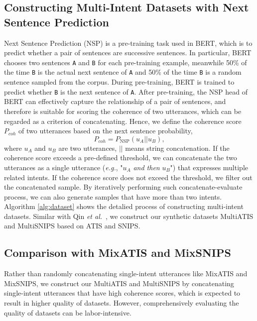 \documentclass[11pt]{article}
\begin{document}
\subsection{Constructing Multi-Intent Datasets with Next Sentence Prediction}
Next Sentence Prediction (NSP) is a pre-training task used in BERT\cite{DBLP:conf/naacl/DevlinCLT19}, which is to predict whether a pair of sentences are successive sentences. In particular, BERT chooses two sentences \texttt{A} and \texttt{B} for each pre-training example, meanwhile 50\% of the time \texttt{B} is the actual next sentence of \texttt{A} and 50\% of the time \texttt{B} is a random sentence sampled from the corpus. During pre-training, BERT is trained to predict whether \texttt{B} is the next sentence of \texttt{A}. After pre-training, the NSP head of BERT can effectively capture the relationship of a pair of sentences, and therefore is suitable for scoring the coherence of two utterances, which can be regarded as a criterion of concatenating. Hence, we define the coherence score $P_{coh}$ of two utterances based on the next sentence probability,
\begin{equation}
    P_{coh} = P_{\text{NSP}}(u_A||u_B),
\end{equation}
where $u_A$ and $u_B$ are two utterances, $||$ means string concatenation. If the coherence score exceeds a pre-defined threshold, we can concatenate the two utterances as a single utterance (\emph{e.g.}, "$u_A$ \textit{and then} $u_B$") that expresses multiple related intents. If the coherence score does not exceed the threshold, we filter out the concatenated sample. By iteratively performing such concatenate-evaluate process, we can also generate samples that have more than two intents. Algorithm \ref{alg:dataset} shows the detalied process of constructing multi-intent datasets. Similar with Qin \emph{et al.}~\cite{DBLP:conf/emnlp/QinXCL20}, we construct our synthetic datasets MultiATIS and MultiSNIPS based on ATIS and SNIPS.

\subsection{Comparison with MixATIS and MixSNIPS}
Rather than randomly concatenating single-intent utterances like MixATIS and MixSNIPS, we construct our MultiATIS and MultiSNIPS by concatenating single-intent utterances that have high coherence scores, which is expected to result in higher quality of datasets. However, comprehensively evaluating the quality of datasets can be labor-intensive. 
\end{document}

